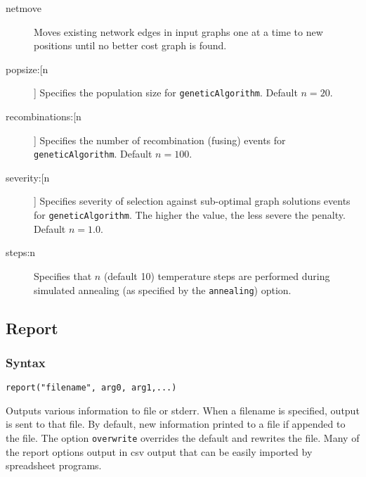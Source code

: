 \begin{description}
		\item[netmove] Moves existing network edges in input graphs one at a time to new positions 
		until no better cost graph 
		is found.
			
		\item[popsize:[n]] Specifies the population size for \texttt{geneticAlgorithm}. Default $n=20$.
			
		\item[recombinations:[n]] Specifies the number of recombination (fusing) events for 
		\texttt{geneticAlgorithm}. Default $n=100$.
			
		\item[severity:[n]] Specifies severity of selection against sub-optimal graph solutions events 
		for \texttt{geneticAlgorithm}. The higher the value, the less severe the penalty. Default $n=1.0$.
			
		\item[steps:n] Specifies that $n$ (default 10) temperature steps are performed during simulated 
		annealing (as specified by the \texttt{annealing}) option.
		\end{description}
	
\subsection{Report}
	\subsubsection{Syntax}
		\texttt{report("filename", arg0, arg1,...)}
	
	\begin{phygdescription}
		{Outputs various information to file or stderr. When a filename is specified, output is sent to 
		that file. By default, new information printed to a file if appended to the file. The option 
		\texttt{overwrite} overrides the default and rewrites the file. Many of the report options output in 
		csv output that can be easily imported by spreadsheet programs.}
	\end{phygdescription}
	

